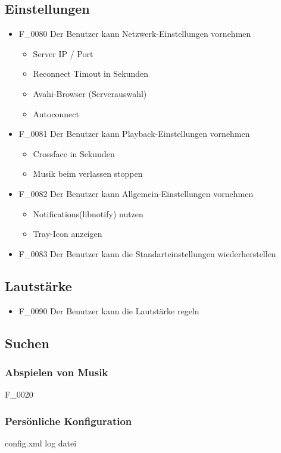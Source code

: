 \subsection{Einstellungen}
\begin{itemize}
	\item F\_0080 Der Benutzer kann Netzwerk-Einstellungen vornehmen
	\begin{itemize}
		\item Server IP / Port
		\item Reconnect Timout in Sekunden
		\item Avahi-Browser (Serverauswahl)
		\item Autoconnect
	\end{itemize}
	\item F\_0081 Der Benutzer kann Playback-Einstellungen vornehmen	
	\begin{itemize}
		\item Crossface in Sekunden
		\item Musik beim verlassen stoppen
	\end{itemize}
	\item F\_0082 Der Benutzer kann Allgemein-Einstellungen vornehmen
	\begin{itemize}
		\item Notifications(libnotify) nutzen
		\item Tray-Icon anzeigen
	\end{itemize}	
	\item F\_0083 Der Benutzer kann die Standarteinstellungen wiederherstellen
\end{itemize}
\subsection{Lautstärke}
\begin{itemize}
	\item F\_0090 Der Benutzer kann die Lautstärke regeln
\end{itemize}
\subsection{Suchen}
\subsubsection{Abspielen von Musik}
	\item F\_0020 
\subsubsection{Persönliche Konfiguration}
config.xml
log datei
